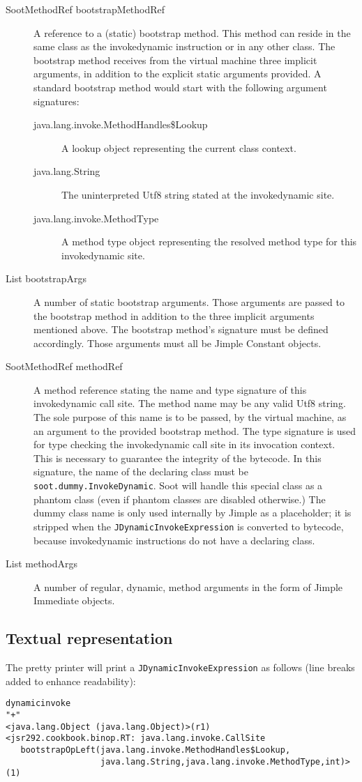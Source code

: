 \documentclass{article}
\newcommand{\id}{invokedynamic\xspace}
\begin{document}
\begin{description}
  \item[SootMethodRef bootstrapMethodRef] A reference to a (static)
  bootstrap method. This method can reside in the same class as the \id instruction or in any
  other class. The bootstrap method receives from the virtual machine three
  implicit arguments, in addition to the explicit static arguments provided. A standard bootstrap
  method would start with the following argument signatures:
  \begin{description}
  \item[java.lang.invoke.MethodHandles\$Lookup] A lookup object representing the
  current class context.
  \item[java.lang.String] The uninterpreted Utf8 string stated at the \id site.
  \item[java.lang.invoke.MethodType] A method type object representing the
  resolved method type for this \id site.
  \end{description}
  \item[List bootstrapArgs] A number of static bootstrap arguments. Those
  arguments are passed to the bootstrap method in addition to the three implicit
  arguments mentioned above. The bootstrap method's signature must be defined
  accordingly. Those arguments must all be Jimple Constant objects.
  \item[SootMethodRef methodRef] A method reference stating the name and type
  signature of this \id call site. The method name may be any valid Utf8 string.
  The sole purpose of this name is to be passed, by the virtual machine, as an
  argument to the provided bootstrap method. The type signature is used for type
  checking the \id call site in its invocation context. This is necessary to
  guarantee the integrity of the bytecode.
  In this signature, the name of the declaring class must be
  \texttt{soot.dummy.InvokeDynamic}.
  Soot will handle this special class as a phantom class (even if phantom
  classes are disabled otherwise.) The dummy class name is only used internally by Jimple as a placeholder; it is
  stripped when the \texttt{JDynamicInvokeExpression} is converted to bytecode, because
  invokedynamic instructions do not have a declaring class. 
  \item[List methodArgs] A number of regular, dynamic, method arguments in the
  form of Jimple Immediate objects.
\end{description}

\subsection*{Textual representation}
The pretty printer will print a \texttt{JDynamicInvokeExpression} as follows
(line breaks added to enhance readability):
\begin{verbatim}
dynamicinvoke
"+"
<java.lang.Object (java.lang.Object)>(r1)
<jsr292.cookbook.binop.RT: java.lang.invoke.CallSite
   bootstrapOpLeft(java.lang.invoke.MethodHandles$Lookup,
                   java.lang.String,java.lang.invoke.MethodType,int)>(1)
\end{verbatim}
\end{document}
